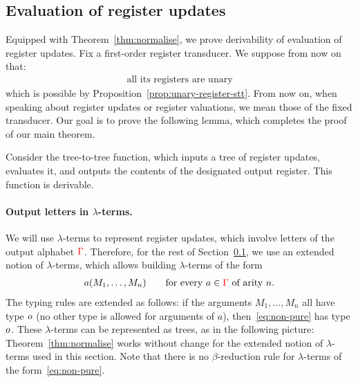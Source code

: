 \subsection{Evaluation of register updates}
\label{sec:updates-endgame}
Equipped with Theorem~\ref{thm:normalise}, we  prove derivability of  evaluation of  register updates. 
Fix a first-order register transducer. We suppose from now on that:
\begin{align}  \label{assumption}
\text{all its registers are unary} 
\end{align} 
which is possible by Proposition~\ref{prop:unary-register-stt}.
From now on, when speaking about register updates or register valuations, we mean those of the fixed transducer. 
Our goal is to prove the following lemma, which completes the proof of our main theorem.
\begin{lemma}\label{lem:derive-register-updates}
    Consider
    the   tree-to-tree function, which inputs a tree of  register updates, evaluates it, and outputs the  contents of the designated output register. This function is derivable. 
\end{lemma}

\paragraph*{Output letters in $\lambda$-terms.} We will   use $\lambda$-terms to represent register updates, which involve letters of the output alphabet ${\color{red}{\Gamma}}$. Therefore, for the  rest of Section~\ref{sec:updates-endgame}, we use an extended notion of $\lambda$-terms, which allows  building $\lambda$-terms of the form 
\begin{align}\label{eq:non-pure}
a(M_1,\ldots,M_n) \qquad \text{for every $a \in {\color{red}{\Gamma}}$ of arity $n$.}
\end{align}
The typing rules are extended as follows: if the arguments $M_1,\ldots,M_n$ all have type $o$ (no other type is allowed for arguments of $a$),  then~\eqref{eq:non-pure} has type $o$. These $\lambda$-terms can  be represented as trees, as in the following picture:
Theorem~\ref{thm:normalise} works without change for the extended notion of  $\lambda$-terms used in this section. Note that there is no $\beta$-reduction rule for $\lambda$-terms of the form~\eqref{eq:non-pure}.


